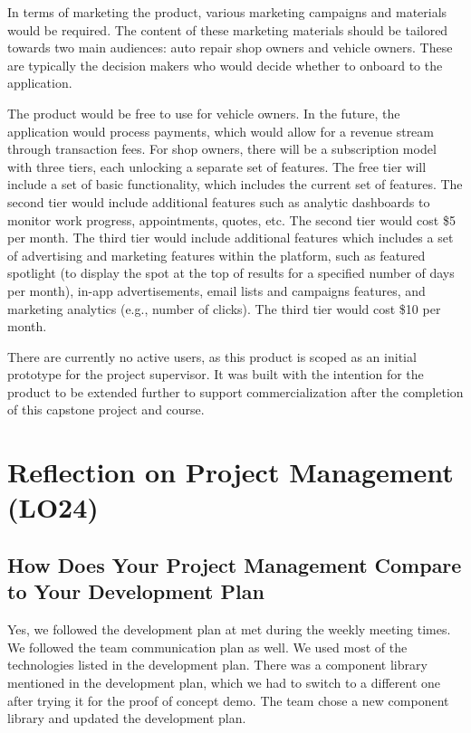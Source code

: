 \documentclass{article}
\begin{document}
In terms of marketing the product, various marketing campaigns and materials would be required. The
content of these marketing materials should be tailored towards two main audiences: auto repair
shop owners and vehicle owners. These are typically the decision makers who would decide whether to
onboard to the application.

The product would be free to use for vehicle owners. In the future, the application would process
payments, which would allow for a revenue stream through transaction fees. For shop owners, there
will be a subscription model with three tiers, each unlocking a separate set of features. The free
tier will include a set of basic functionality, which includes the current set of features. The
second tier would include additional features such as analytic dashboards to monitor work progress,
appointments, quotes, etc. The second tier would cost \$5 per month. The third tier would include
additional features which includes a set of advertising and marketing features within the platform,
such as featured spotlight (to display the spot at the top of results for a specified number of
days per month), in-app advertisements, email lists and campaigns features, and marketing analytics
(e.g., number of clicks). The third tier would cost \$10 per month.

There are currently no active users, as this product is scoped as an initial prototype for the
project supervisor. It was built with the intention for the product to be extended further to
support commercialization after the completion of this capstone project and course.

\section{Reflection on Project Management (LO24)}

\subsection{How Does Your Project Management Compare to Your Development Plan}
Yes, we followed the development plan at met during the weekly meeting times. We followed the team
communication plan as well. We used most of the technologies listed in the development plan. There
was a component library mentioned in the development plan, which we had to switch to a different
one after trying it for the proof of concept demo. The team chose a new component library and
updated the development plan.
\end{document}
